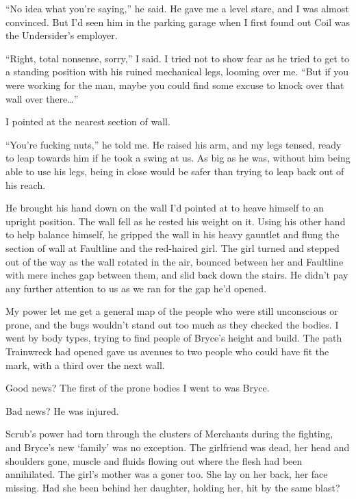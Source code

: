 ``No idea what you're saying,'' he said.  He gave me a level stare, and I was almost convinced.  But I'd seen him in the parking garage when I first found out Coil was the Undersider's employer.



``Right, total nonsense, sorry,'' I said.  I tried not to show fear as he tried to get to a standing position with his ruined mechanical legs, looming over me.  ``But if you were working for the man, maybe you could find some excuse to knock over that wall over there\ldots''



I pointed at the nearest section of wall.



``You're fucking nuts,'' he told me.  He raised his arm, and my legs tensed, ready to leap towards him if he took a swing at us.  As big as he was, without him being able to use his legs, being in close would be safer than trying to leap back out of his reach.



He brought his hand down on the wall I'd pointed at to heave himself to an upright position.  The wall fell as he rested his weight on it.  Using his other hand to help balance himself, he gripped the wall in his heavy gauntlet and flung the section of wall at Faultline and the red-haired girl.  The girl turned and stepped out of the way as the wall rotated in the air, bounced between her and Faultline with mere inches gap between them, and slid back down the stairs.  He didn't pay any further attention to us as we ran for the gap he'd opened.



My power let me get a general map of the people who were still unconscious or prone, and the bugs wouldn't stand out too much as they checked the bodies.  I went by body types, trying to find people of Bryce's height and build.  The path Trainwreck had opened gave us avenues to two people who could have fit the mark, with a third over the next wall.



Good news?  The first of the prone bodies I went to was Bryce.



Bad news?  He was injured.



Scrub's power had torn through the clusters of Merchants during the fighting, and Bryce's new `family' was no exception.  The girlfriend was dead, her head and shoulders gone, muscle and fluids flowing out where the flesh had been annihilated.  The girl's mother was a goner too.  She lay on her back, her face missing.  Had she been behind her daughter, holding her, hit by the same blast?



